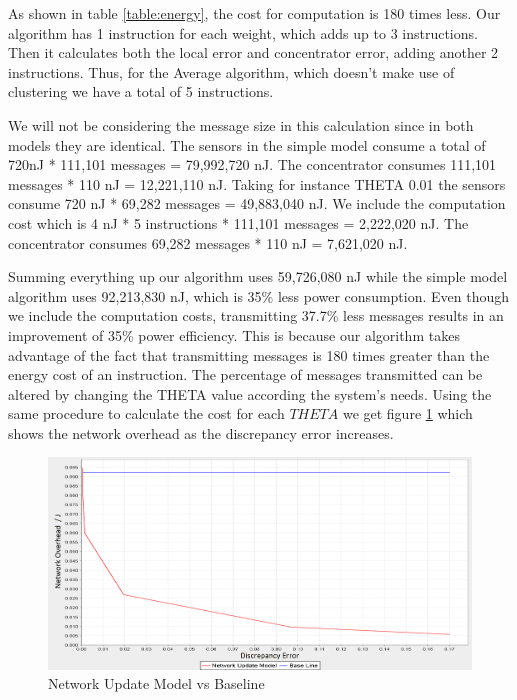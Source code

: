 \documentclass{mproj}
\begin{document}
As shown in table \ref{table:energy}, the cost for computation is 180 times less. Our algorithm has 1 instruction for each weight, which adds up to 3 instructions. Then it calculates both the local error and concentrator error, adding another 2 instructions. Thus, for the Average algorithm, which doesn't make use of clustering we have a total of 5 instructions.

We will not be considering the message size in this calculation since in both models they are identical. The sensors in the simple model consume a total of 720nJ * 111,101 messages = 79,992,720 nJ. The concentrator consumes 111,101 messages * 110 nJ = 12,221,110 nJ.
Taking for instance THETA 0.01 the sensors consume 720 nJ * 69,282 messages = 49,883,040 nJ. We include the computation cost which is 4 nJ * 5 instructions * 111,101 messages = 2,222,020 nJ. The concentrator consumes 69,282 messages * 110 nJ = 7,621,020 nJ.

Summing everything up our algorithm uses 59,726,080 nJ while the simple model algorithm uses 92,213,830 nJ, which is 35\% less power consumption. Even though we include the computation costs, transmitting 37.7\% less messages results in an improvement of 35\% power efficiency. This is because our algorithm takes advantage of the fact that transmitting messages is 180 times greater than the energy cost of an instruction. The percentage of messages transmitted can be altered by changing the THETA value according the system's needs. Using the same procedure to calculate the cost for each $THETA$ we get figure \ref{fig:updateModelJoules} which shows the network overhead as the discrepancy error increases.

\begin{figure}[H]
\caption{Network Update Model vs Baseline}
\label{fig:updateModelJoules}
\centerline{\includegraphics[scale=0.45]{updateModelJoules}}
\end{figure}
\end{document}
